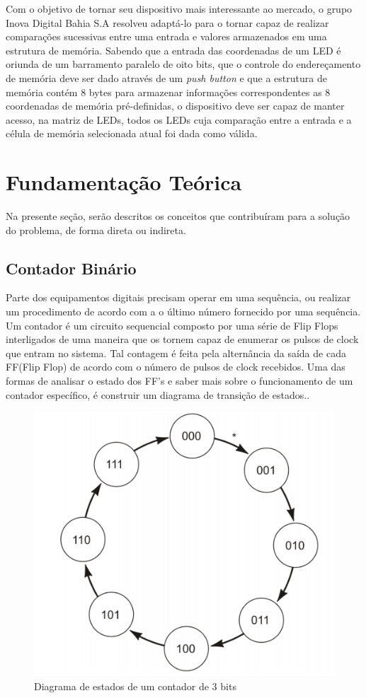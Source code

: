 \documentclass[12pt]{article}
\begin{document}
Com o objetivo de tornar seu dispositivo mais interessante ao mercado, o grupo Inova Digital Bahia S.A resolveu adaptá-lo para o tornar capaz de realizar comparações sucessivas entre uma entrada e valores armazenados em uma estrutura de memória. Sabendo que a entrada das coordenadas de um LED é oriunda de um barramento paralelo de oito bits, que o controle do endereçamento de memória deve ser dado através de um \textit{push button} e que a estrutura de memória contém 8 bytes para armazenar informações correspondentes as 8 coordenadas de memória pré-definidas, o dispositivo deve ser capaz de manter acesso, na matriz de LEDs, todos os LEDs cuja comparação entre a entrada e a célula de memória selecionada atual foi dada como válida.

\section{Fundamentação Teórica}

Na presente seção, serão descritos os conceitos que contribuíram para a solução do problema, de forma direta ou indireta.

\subsection{Contador Binário}

Parte dos equipamentos digitais precisam operar em uma sequência, ou realizar um procedimento de acordo com a o último número fornecido por uma sequência. Um contador é um circuito sequencial composto por uma série de Flip Flops interligados de uma maneira que os tornem capaz de enumerar os pulsos de clock que entram no sistema. Tal contagem é feita pela alternância da saída de cada FF(Flip Flop) de acordo com o número de pulsos de clock recebidos. Uma das formas de analisar o estado dos FF's e saber mais sobre o funcionamento de um contador específico, é construir um diagrama de transição de estados.\cite{tocci1997digital}.

\begin{figure}[!htbp]
\centering
\includegraphics[width=.5\textwidth]{img/diagrama-estados.png}
\caption{Diagrama de estados de um contador de 3 bits\cite{tocci1997digital}}
\label{fig:diagrama-estados}
\end{figure}
\end{document}
